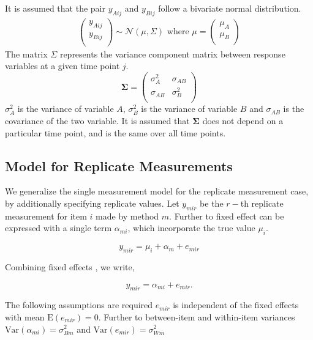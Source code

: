 \documentclass[12pt, a4paper]{report}
\theoremstyle{plain}
\theoremstyle{definition}
\theoremstyle{remark}
\begin{document}
It is assumed that the pair $y_{Aij}$ and $y_{Bij}$ follow a bivariate normal distribution.
\begin{eqnarray}
\left(
\begin{array}{c}
y_{Aij} \\
y_{Bij} \\
\end{array}
\right) \sim \mathcal{N}(
{\mu}, {\Sigma})\mbox{   where } {\mu} = \left(
\begin{array}{c}
\mu_{A} \\
\mu_{B} \\
\end{array}
\right)
\end{eqnarray}
The matrix ${\Sigma}$ represents the variance component matrix between response variables at a given time point $j$.
\begin{equation}
\boldsymbol{\Sigma} = \left( \begin{array}{cc}
\sigma^2_{A} & \sigma_{AB} \\
\sigma_{AB} & \sigma^2_{B}\\
\end{array}\right)
\end{equation}
$\sigma^2_{A}$ is the variance of variable $A$, $\sigma^2_{B}$ is the variance of variable $B$ and $\sigma_{AB}$ is the covariance of the two variable. It is assumed that $\boldsymbol{\Sigma}$ does not depend on a particular time point, and is the same over all time points.


\subsection{Model for Replicate Measurements}



We generalize the single measurement model for the replicate measurement case, by additionally specifying replicate values. Let $y_{mir}$ be the $r-$th replicate measurement for item $i$ made by method $m$. Further to \citet{barnhart} fixed effect can be expressed with a single term $\alpha_{mi}$, which incorporate the true value $\mu_i$.

\[ y_{mir} = \mu_{i} + \alpha_{m} + e_{mir}  \]

Combining fixed effects \citep{barnhart}, we write,

\[ y_{mir} = \alpha_{mi} + e_{mir}.\]

The following assumptions are required
$e_{mir}$ is independent of the fixed effects with mean $\mbox{E}(e_{mir}) = 0$.
Further to \citet{barnhart} between-item and within-item variances $\mbox{Var}(\alpha_{mi}) = \sigma^2_{Bm}$ and $\mbox{Var}(e_{mir}) = \sigma^2_{Wm}$		
\end{document}
